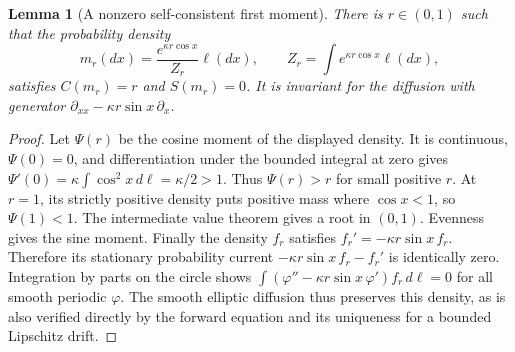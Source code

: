 \documentclass[11pt,a4paper]{article}
\newtheorem{lemma}[theorem]{Lemma}
\theoremstyle{remark}
\begin{document}
\begin{lemma}[A nonzero self-consistent first moment]
There is $r\in(0,1)$ such that the probability density
\[
 m_r(dx)=\frac{e^{\kappa r\cos x}}{Z_r}\ell(dx),\qquad
 Z_r=\int e^{\kappa r\cos x}\ell(dx),
\]
satisfies $C(m_r)=r$ and $S(m_r)=0$. It is invariant for the diffusion with generator $\partial_{xx}-\kappa r\sin x\,\partial_x$.
\end{lemma}
\begin{proof}
Let $\Psi(r)$ be the cosine moment of the displayed density. It is continuous, $\Psi(0)=0$, and differentiation under the bounded integral at zero gives $\Psi'(0)=\kappa\int\cos^2x\,d\ell=\kappa/2>1$. Thus $\Psi(r)>r$ for small positive $r$. At $r=1$, its strictly positive density puts positive mass where $\cos x<1$, so $\Psi(1)<1$. The intermediate value theorem gives a root in $(0,1)$. Evenness gives the sine moment. Finally the density $f_r$ satisfies $f_r'=-\kappa r\sin x\,f_r$. Therefore its stationary probability current $-\kappa r\sin x\,f_r-f_r'$ is identically zero. Integration by parts on the circle shows $\int (\varphi''-\kappa r\sin x\,\varphi')f_r\,d\ell=0$ for all smooth periodic $\varphi$. The smooth elliptic diffusion thus preserves this density, as is also verified directly by the forward equation and its uniqueness for a bounded Lipschitz drift.
\end{proof}
\end{document}
